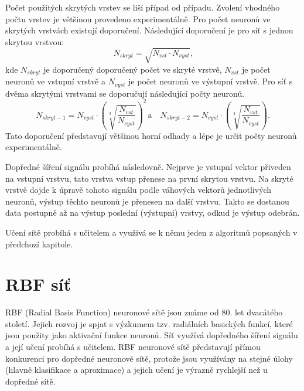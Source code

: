\documentclass[11pt,twoside,a4paper]{book}
\begin{document}
Počet použitých skrytých vrstev se liší případ od případu. Zvolení vhodného počtu vrstev je většinou provedeno experimentálně. Pro počet neuronů ve skrytých vrstvách existují doporučení. Následující doporučení je pro síť s jednou skrytou vrstvou:
\begin{equation}
N_{skryt}=\sqrt{N_{vst}\cdot N_{vyst}} \mbox{,}
\end{equation}
kde \begin{math}N_{skryt}\end{math} je doporučený doporučený počet ve skryté vrstvě, \begin{math}N_{vst}\end{math} je počet neuronů ve vstupní vrstvě a \begin{math}N_{vyst}\end{math} je počet neuronů ve výstupní vrstvě. Pro síť s dvěma skrytými vrstvami se doporučují následující počty neuronů.
\begin{equation}
N_{skryt-1}=N_{vyst}\cdot\left(\sqrt[3]{\frac{N_{vst}}{N_{vyst}}}\right)^{2} \,\mbox{a} \,\,\,\,\,\, N_{skryt-2}=N_{vyst}\cdot\left(\sqrt[3]{\frac{N_{vst}}{N_{vyst}}}\right)\mbox{.}
\end{equation}
Tato doporučení představují většinou horní odhady a lépe je určit počty neuronů experimentálně.\citep{skripta}

Dopředné šíření signálu probíhá následovně. Nejprve je vstupní vektor přiveden na vstupní vrstvu, tato vrstva vstup přenese na první skrytou vrstvu. Na skryté vrstvě dojde k úpravě tohoto signálu podle váhových vektorů jednotlivých neuronů, výstup těchto neuronů je přenesen na další vrstvu. Takto se dostanou data postupně až na výstup poslední (výstupní) vrstvy, odkud je výstup odebrán.

Učení sítě probíhá s učitelem a využívá se k němu jeden z algoritmů popsaných v předchozí kapitole.
\section{RBF síť}
RBF (Radial Basis Function) neuronové sítě jsou známe od 80. let dvacátého století. Jejich rozvoj je spjat s výzkumem tzv. radiálních basických funkcí, které jsou použity jako aktivační funkce neuronů. Síť využívá dopředného šíření signálu a její učení probíhá s učitelem. RBF neuronové sítě představují přímou konkurenci pro dopředné neuronové sítě, protože jsou využívány na stejné úlohy (hlavně klasifikace a aproximace) a jejich učení je výrazně rychlejší než u dopředné sítě.
\end{document}
